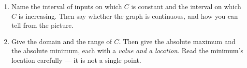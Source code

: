\documentclass[10pt]{article}
\begin{document}
\begin{tcolorbox}[colback=white, colframe=black!40, title=\textbf{Tier R --- Remediate},
    fonttitle=\bfseries, arc=2mm, left=3mm, right=3mm, top=2mm, bottom=2mm, breakable]
\begin{enumerate}[leftmargin=1.6em, itemsep=4pt, topsep=2pt]
  \item Name the interval of inputs on which $C$ is constant and the interval on which $C$ is
        increasing. Then say whether the graph is continuous, and how you can tell from the picture.


  \item Give the domain and the range of $C$. Then give the absolute maximum and the absolute
        minimum, each with a \emph{value and a location}. Read the minimum's location carefully ---
        it is not a single point.

\end{enumerate}
\end{tcolorbox}

\vspace{0.10in}
\end{document}
